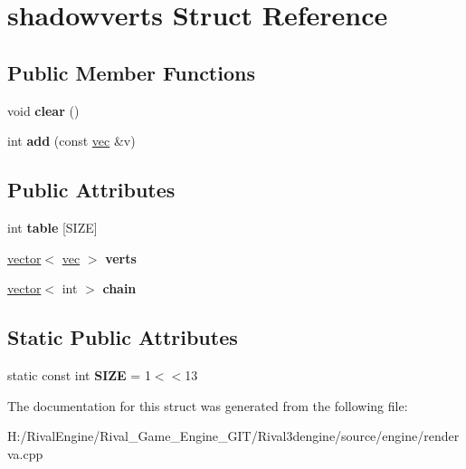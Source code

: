 \hypertarget{structshadowverts}{}\section{shadowverts Struct Reference}
\label{structshadowverts}
\subsection*{Public Member Functions}
\begin{DoxyCompactItemize}
\item 
\mbox{\label{structshadowverts_a181757194e9601a704502cfd2b1a2fed}} 
void {\bfseries clear} ()
\item 
\mbox{\label{structshadowverts_a2205343269e3b62e457a6d4ba7bf75bf}} 
int {\bfseries add} (const \hyperlink{structvec}{vec} \&v)
\end{DoxyCompactItemize}
\subsection*{Public Attributes}
\begin{DoxyCompactItemize}
\item 
\mbox{\label{structshadowverts_a51f679ab6da02af6040640ef0ba89014}} 
int {\bfseries table} \mbox{[}S\+I\+ZE\mbox{]}
\item 
\mbox{\label{structshadowverts_ae753df8d20e83b2f8ee0f2098d7ecd12}} 
\hyperlink{structvector}{vector}$<$ \hyperlink{structvec}{vec} $>$ {\bfseries verts}
\item 
\mbox{\label{structshadowverts_ae2268227809ea070c4f89d358e175469}} 
\hyperlink{structvector}{vector}$<$ int $>$ {\bfseries chain}
\end{DoxyCompactItemize}
\subsection*{Static Public Attributes}
\begin{DoxyCompactItemize}
\item 
\mbox{\label{structshadowverts_aa5f5bee1663d87fde0d5ee2c9d6fbda6}} 
static const int {\bfseries S\+I\+ZE} = 1$<$$<$13
\end{DoxyCompactItemize}


The documentation for this struct was generated from the following file\+:\begin{DoxyCompactItemize}
\item 
H\+:/\+Rival\+Engine/\+Rival\+\_\+\+Game\+\_\+\+Engine\+\_\+\+G\+I\+T/\+Rival3dengine/source/engine/renderva.\+cpp\end{DoxyCompactItemize}
